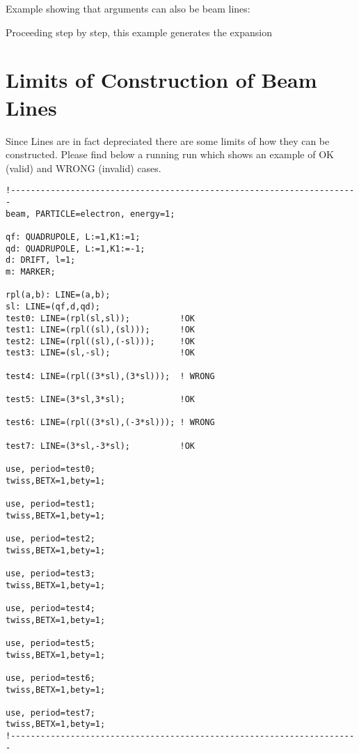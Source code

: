 Example showing that arguments can also be beam lines:

Proceeding step by step, this example generates the expansion 


\section{Limits of Construction of Beam Lines}  

Since Lines are in fact depreciated there are some limits of how they
can be constructed. Please find below a running \madx run which shows an
example of OK (valid) and WRONG (invalid) cases.   

\begin{verbatim}
!----------------------------------------------------------------------
beam, PARTICLE=electron, energy=1;

qf: QUADRUPOLE, L:=1,K1:=1;
qd: QUADRUPOLE, L:=1,K1:=-1;
d: DRIFT, l=1;
m: MARKER;

rpl(a,b): LINE=(a,b);
sl: LINE=(qf,d,qd);
test0: LINE=(rpl(sl,sl));          !OK 
test1: LINE=(rpl((sl),(sl)));      !OK
test2: LINE=(rpl((sl),(-sl)));     !OK
test3: LINE=(sl,-sl);              !OK

test4: LINE=(rpl((3*sl),(3*sl)));  ! WRONG

test5: LINE=(3*sl,3*sl);           !OK

test6: LINE=(rpl((3*sl),(-3*sl))); ! WRONG

test7: LINE=(3*sl,-3*sl);          !OK

use, period=test0;
twiss,BETX=1,bety=1;

use, period=test1;
twiss,BETX=1,bety=1;

use, period=test2;
twiss,BETX=1,bety=1;

use, period=test3;
twiss,BETX=1,bety=1;

use, period=test4;
twiss,BETX=1,bety=1;

use, period=test5;
twiss,BETX=1,bety=1;

use, period=test6;
twiss,BETX=1,bety=1;

use, period=test7;
twiss,BETX=1,bety=1;
!----------------------------------------------------------------------
\end{verbatim}



